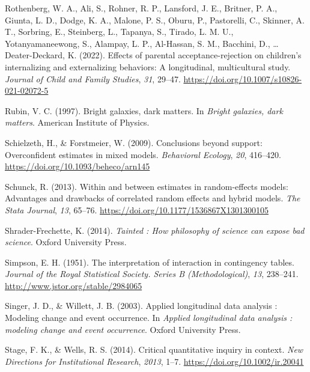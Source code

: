 \documentclass[
  letterpaper,
  DIV=11,
  numbers=noendperiod]{scrreprt}
\newlength{\cslhangindent}
\newlength{\cslentryspacingunit} %
\newenvironment{CSLReferences}[2] %
 {%
  \setlength{\parindent}{0pt}
  \ifodd #1
  \let\oldpar\par
  \def\par{\hangindent=\cslhangindent\oldpar}
  \fi
  \setlength{\parskip}{#2\cslentryspacingunit}
 }%
 {}
\begin{document}
\begin{CSLReferences}{1}{0}
\leavevmode{}%
Rothenberg, W. A., Ali, S., Rohner, R. P., Lansford, J. E., Britner, P.
A., Giunta, L. D., Dodge, K. A., Malone, P. S., Oburu, P., Pastorelli,
C., Skinner, A. T., Sorbring, E., Steinberg, L., Tapanya, S., Tirado, L.
M. U., Yotanyamaneewong, S., Alampay, L. P., Al-Hassan, S. M., Bacchini,
D., \ldots{} Deater-Deckard, K. (2022). Effects of parental
acceptance-rejection on children's internalizing and externalizing
behaviors: A longitudinal, multicultural study. \emph{Journal of Child
and Family Studies}, \emph{31}, 29--47.
\url{https://doi.org/10.1007/s10826-021-02072-5}

\leavevmode{}%
Rubin, V. C. (1997). Bright galaxies, dark matters. In \emph{Bright
galaxies, dark matters}. American Institute of Physics.

\leavevmode{}%
Schielzeth, H., \& Forstmeier, W. (2009). Conclusions beyond support:
Overconfident estimates in mixed models. \emph{Behavioral Ecology},
\emph{20}, 416--420. \url{https://doi.org/10.1093/beheco/arn145}

\leavevmode{}%
Schunck, R. (2013). Within and between estimates in random-effects
models: Advantages and drawbacks of correlated random effects and hybrid
models. \emph{The Stata Journal}, \emph{13}, 65--76.
\url{https://doi.org/10.1177/1536867X1301300105}

\leavevmode{}%
Shrader-Frechette, K. (2014). \emph{Tainted : How philosophy of science
can expose bad science}. Oxford University Press.

\leavevmode{}%
Simpson, E. H. (1951). The interpretation of interaction in contingency
tables. \emph{Journal of the Royal Statistical Society. Series B
(Methodological)}, \emph{13}, 238--241.
\url{http://www.jstor.org/stable/2984065}

\leavevmode{}%
Singer, J. D., \& Willett, J. B. (2003). Applied longitudinal data
analysis : Modeling change and event occurrence. In \emph{Applied
longitudinal data analysis : modeling change and event occurrence}.
Oxford University Press.

\leavevmode{}%
Stage, F. K., \& Wells, R. S. (2014). Critical quantitative inquiry in
context. \emph{New Directions for Institutional Research}, \emph{2013},
1--7. \url{https://doi.org/10.1002/ir.20041}


\end{CSLReferences}
\end{document}
